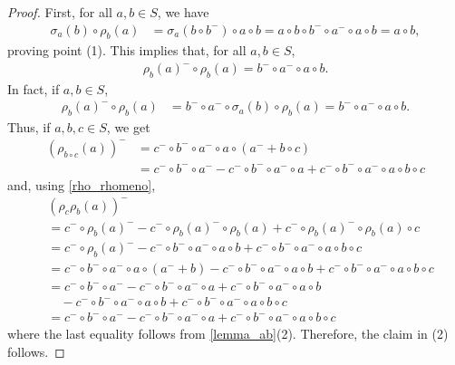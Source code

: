 \documentclass[preprint,1p]{elsarticle}
\theoremstyle{definition}               %
\begin{document}
\begin{proof}
    First, for all $a, b \in S$, %
we have
\begin{align*}
    \sigma_a(b)\circ \rho_b(a)&%
    =\sigma_a\left(b \circ b^-\right)\circ a \circ b=a \circ b \circ b^- \circ a^- \circ a \circ b=a\circ b,
\end{align*}
proving point (1). This implies that, for all $a, b \in S$,
\begin{align}\label{rho_rhomeno}
    \rho_b(a)^- \circ \rho_b(a)=b^- \circ a^- \circ a \circ b.
\end{align}
In fact, if $a, b \in S$,
\begin{align*}
    \rho_b(a)^- \circ \rho_b(a)&=b^- \circ a^- \circ \sigma_a(b)\circ \rho_b(a)=b^- \circ a^- \circ a \circ b.
\end{align*}
Thus, if $a, b, c \in S$, we get
\begin{align*}
    \left(\rho_{b \circ c}(a)\right)^-&=c^- \circ b^- \circ a^- \circ a \circ \left(a^-+b \circ c\right)\\
    &=c^- \circ b^- \circ a^- - c^- \circ b^- \circ a^-\circ a+ c^- \circ b^- \circ a^- \circ a\circ b \circ c
\end{align*}
and, using \eqref{rho_rhomeno},
\begin{align*}
   &\left( \rho_c\rho_b(a)\right)^-\\
   &=c^- \circ \rho_b(a)^--c^- \circ \rho_b(a)^- \circ \rho_b(a)+c^- \circ \rho_b(a)^- \circ \rho_b(a) \circ c\\
   &= c^- \circ \rho_b(a)^-- c^- \circ b^- \circ a^- \circ a \circ b+ c^- \circ b^- \circ a^- \circ a \circ b \circ c\\
   &=c^- \circ b^- \circ a^- \circ a \circ \left(a^-+b\right)- c^- \circ b^- \circ a^- \circ a \circ b+ c^- \circ b^- \circ a^- \circ a \circ b \circ c\\
   &=c^- \circ b^- \circ a^--c^- \circ b^- \circ a^- \circ a+c^- \circ b^- \circ a^- \circ a\circ b\\
   &\quad - c^- \circ b^- \circ a^- \circ a \circ b+ c^- \circ b^- \circ a^- \circ a \circ b \circ c\\
   &=c^- \circ b^- \circ a^- - c^- \circ b^- \circ a^-\circ a+ c^- \circ b^- \circ a^- \circ a\circ b \circ c 
\end{align*}
where the last equality follows from \cref{lemma_ab}(2).  
Therefore, the claim in (2) follows.
\end{proof}
\end{document}
